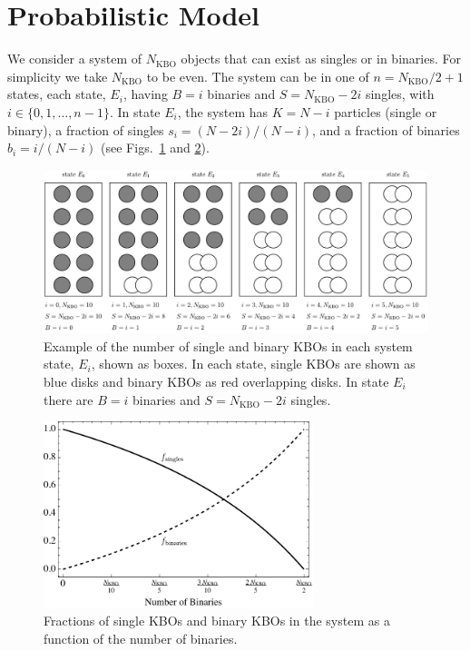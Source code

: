 \documentclass[a4paper,12pt]{article}
\begin{document}
\section{Probabilistic Model}
\label{sec:probabilisticModel}

We consider a system of $N_\text{KBO}$ objects that can exist as singles or in binaries.  For simplicity we take $N_\text{KBO}$ to be even.  The system can be in one of $n=N_\text{KBO}/2+1$ states, each state, $E_i$, having $B=i$ binaries and $S=N_\text{KBO}-2i$ singles, with $i\in\{0,1,\dots,n-1\}$.  In state $E_i$, the system has $K=N-i$ particles (single or binary), a fraction of singles $s_i=(N-2i)/(N-i)$, and a fraction of binaries $b_i=i/(N-i)$ (see Figs.~\ref{fig:singlesbinaries} and \ref{fig:fractionsinglesbinaries}).

\begin{figure}
\centering
\includegraphics[width=\textwidth]{SinglesBinaries}
\caption{\label{fig:singlesbinaries}
Example of the number of single and binary KBOs in each system state, $E_i$, shown as boxes. In each state, single KBOs are shown as blue disks and binary KBOs as red overlapping disks. In state $E_i$ there are $B=i$ binaries and $S=N_\text{KBO}-2i$ singles.}
\end{figure}

\begin{figure}
\centering
\includegraphics[width=0.7\textwidth]{FractionOfSinglesBinaries}
\caption{\label{fig:fractionsinglesbinaries}
Fractions of single KBOs and binary KBOs in the system as a function of the number of binaries.}
\end{figure}
\end{document}
